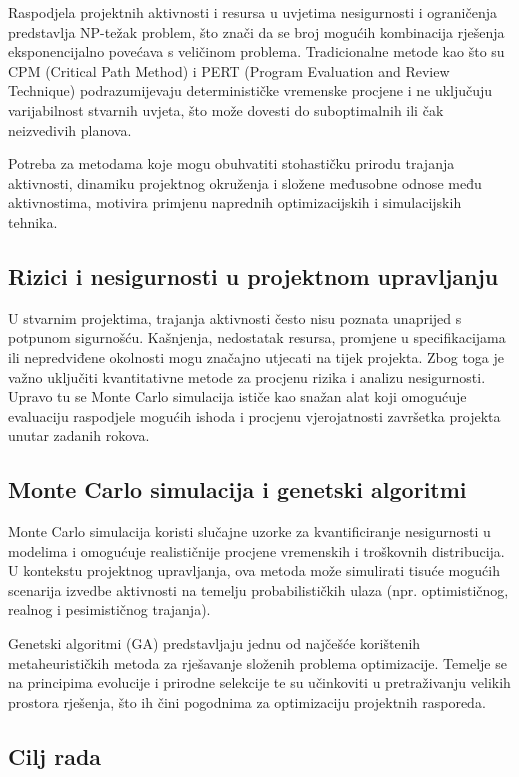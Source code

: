 Raspodjela projektnih aktivnosti i resursa u uvjetima nesigurnosti i ograničenja predstavlja NP-težak problem, što znači da se broj mogućih kombinacija rješenja eksponencijalno povećava s veličinom problema. Tradicionalne metode kao što su CPM (Critical Path Method) i PERT (Program Evaluation and Review Technique) podrazumijevaju determinističke vremenske procjene i ne uključuju varijabilnost stvarnih uvjeta, što može dovesti do suboptimalnih ili čak neizvedivih planova.

Potreba za metodama koje mogu obuhvatiti stohastičku prirodu trajanja aktivnosti, dinamiku projektnog okruženja i složene međusobne odnose među aktivnostima, motivira primjenu naprednih optimizacijskih i simulacijskih tehnika.

\subsection{Rizici i nesigurnosti u projektnom upravljanju}

U stvarnim projektima, trajanja aktivnosti često nisu poznata unaprijed s potpunom sigurnošću. Kašnjenja, nedostatak resursa, promjene u specifikacijama ili nepredviđene okolnosti mogu značajno utjecati na tijek projekta. Zbog toga je važno uključiti kvantitativne metode za procjenu rizika i analizu nesigurnosti. Upravo tu se Monte Carlo simulacija ističe kao snažan alat koji omogućuje evaluaciju raspodjele mogućih ishoda i procjenu vjerojatnosti završetka projekta unutar zadanih rokova.

\subsection{Monte Carlo simulacija i genetski algoritmi}

Monte Carlo simulacija koristi slučajne uzorke za kvantificiranje nesigurnosti u modelima i omogućuje realističnije procjene vremenskih i troškovnih distribucija. U kontekstu projektnog upravljanja, ova metoda može simulirati tisuće mogućih scenarija izvedbe aktivnosti na temelju probabilističkih ulaza (npr. optimističnog, realnog i pesimističnog trajanja).

Genetski algoritmi (GA) predstavljaju jednu od najčešće korištenih metaheurističkih metoda za rješavanje složenih problema optimizacije. Temelje se na principima evolucije i prirodne selekcije te su učinkoviti u pretraživanju velikih prostora rješenja, što ih čini pogodnima za optimizaciju projektnih rasporeda.

\subsection{Cilj rada}

